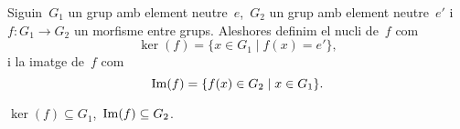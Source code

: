\documentclass[../../main.tex]{subfiles}
\begin{document}
    \begin{definition}
        \label{def:nucli d'un morfisme entre grups}
        \label{def:imatge d'un morfisme entre grups}
        Siguin~\(G_{1}\) un grup amb element neutre~\(e\),~\(G_{2}\) un grup amb  element neutre~\(e'\) i~\(f\colon G_{1}\to G_{2}\) un morfisme entre grups.
        Aleshores definim el nucli de~\(f\) com
        \[
            \ker(f)=\{x\in G_{1}\mid f(x)=e'\},
        \]
        i la imatge de~\(f\) com
        \[
            \operatorname{Im}(f)=\{f(x)\in G_{2}\mid x\in G_{1}\}.
        \]
    \end{definition}
    \begin{observation}
        \label{obs:nucli d'un morfisme entre grups es subconjunt del grup d'entrada, imatge n'és del de sortida}
        \(\ker(f)\subseteq G_{1}\),~\(\operatorname{Im}(f)\subseteq G_{2}\).
    \end{observation}
\end{document}
